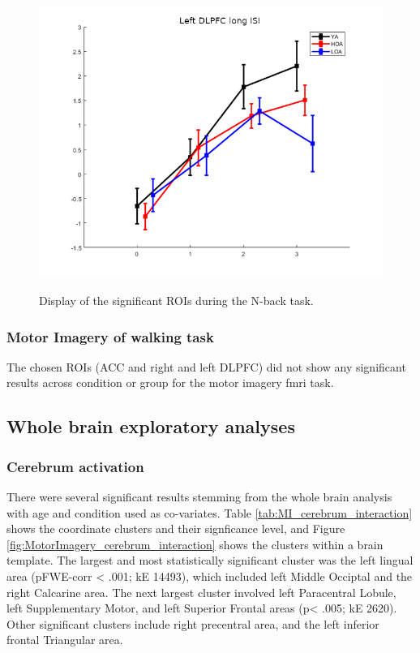 \documentclass[a4paper,fleqn]{cas-sc}
\begin{document}
\begin{figure}[h!]
\begin{minipage}{0.48\textwidth}
         \label{fig:b}
    \end{minipage}
    \begin{minipage}{0.48\textwidth}
        \centering
        \includegraphics[clip, trim=0 0 0 0, width=\linewidth]{figs/Nback1500_ldlpfc_neurosynth.png} %
         \label{fig:b}
    \end{minipage}
    \caption{Display of the significant ROIs during the N-back task.}
    \label{fig:ROI_nbackfmriTasks}
\end{figure}

\clearpage


\subsubsection{Motor Imagery of walking task}
The chosen ROIs (ACC and right and left DLPFC) did not show any significant results across condition or group for the motor imagery fmri task.


\subsection{Whole brain exploratory analyses}
\subsubsection{Cerebrum activation}
There were several significant results stemming from the whole brain analysis with age and condition used as co-variates. Table \ref{tab:MI_cerebrum_interaction} shows the coordinate clusters and their signficance level, and Figure \ref{fig:MotorImagery_cerebrum_interaction} shows the clusters within a brain template. The largest and most statistically significant cluster was the left lingual area (pFWE-corr < .001; kE 14493), which included left Middle Occiptal and the right Calcarine area. The next largest cluster involved left Paracentral Lobule, left Supplementary Motor, and left Superior Frontal areas (p< .005; kE 2620). Other significant clusters include right precentral area, and the left inferior frontal Triangular area. 
\end{document}
